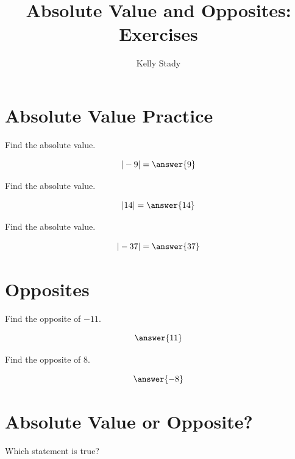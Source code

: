 \documentclass{ximera}[font=12pt]
\title{Absolute Value and Opposites: Exercises}
\author{Kelly Stady}
\begin{document}
\begin{abstract}

\end{abstract}

\maketitle
\label{xim:AbsoluteValueExercises}

\section*{Absolute Value Practice}

\begin{problem}
Find the absolute value.

\[
|-9|=\answer{9}
\]

\end{problem}


\begin{problem}
Find the absolute value.

\[
|14|=\answer{14}
\]

\end{problem}


\begin{problem}
Find the absolute value.

\[
|-37|=\answer{37}
\]

\end{problem}


\section*{Opposites}

\begin{problem}
Find the opposite of $-11$.

\[
\answer{11}
\]

\end{problem}


\begin{problem}
Find the opposite of $8$.

\[
\answer{-8}
\]

\end{problem}


\section*{Absolute Value or Opposite?}

\begin{problem}
Which statement is true?

\begin{multipleChoice}
\end{multipleChoice}

\end{problem}
\end{document}
